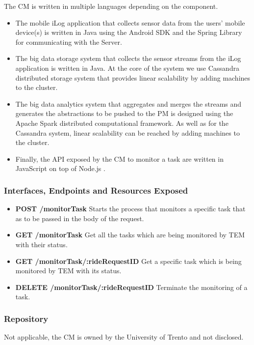 The CM is written in multiple languages depending on the component. 
\begin{itemize}
\item{The mobile iLog application that collects sensor data from the users' mobile device(s) is written in Java using the Android SDK and the Spring Library for communicating with the Server.}
\item{The big data storage system that collects the sensor streams from the iLog application is written in Java. At the core of the system we use Cassandra distributed storage system that provides linear scalability by adding machines to the cluster.}
\item{The big data analytics system that aggregates and merges the streams and generates the abstractions to be pushed to the PM is designed using the Apache Spark distributed computational framework. As well as for the Cassandra system, linear scalability can be reached by adding machines to the cluster.}
\item{Finally, the API exposed by the CM to monitor a task are written in JavaScript on top of Node.js .}
\end{itemize}

\subsubsection{Interfaces, Endpoints and Resources Exposed}

\begin{itemize}
\item {\bf POST /monitorTask} Starts the process that monitors a specific task that as to be passed in the body of the request.
\item {\bf GET /monitorTask} Get all the tasks which are being monitored by TEM with their status.
\item {\bf GET /monitorTask/:rideRequestID} Get a specific task which is being monitored by TEM with its status.
\item {\bf DELETE /monitorTask/:rideRequestID} Terminate the monitoring of a task.
\end{itemize}

\subsubsection{Repository}
Not applicable, the CM is owned by the University of Trento and not disclosed. 
